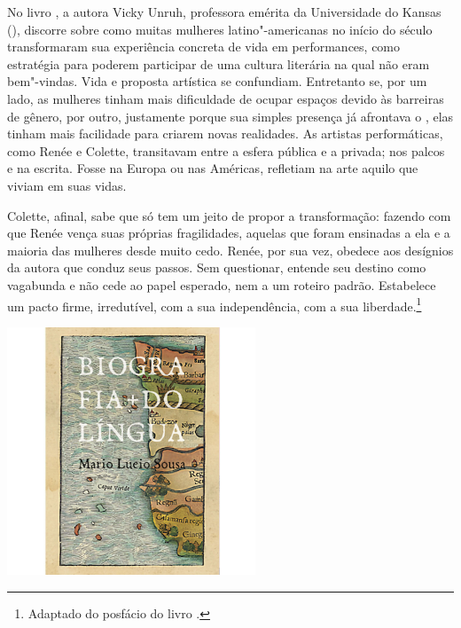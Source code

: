 No livro {}, a autora Vicky Unruh, professora emérita da Universidade do Kansas (), discorre sobre como muitas mulheres latino"-americanas no início do século  transformaram sua experiência concreta de vida em performances, como estratégia para poderem participar de uma cultura literária na qual não eram bem"-vindas. Vida e proposta artística se confundiam. Entretanto se, por um lado, as mulheres tinham mais dificuldade de ocupar espaços devido às barreiras de gênero, por outro, justamente porque sua simples presença já afrontava o {}, elas tinham mais facilidade para criarem novas realidades. As artistas performáticas, como Renée e Colette, transitavam entre a esfera pública e a privada; nos palcos e na escrita. Fosse na Europa ou nas Américas, refletiam na arte aquilo que viviam em suas vidas.

Colette, afinal, sabe que só tem um jeito de propor a transformação: fazendo com que Renée vença suas próprias fragilidades, aquelas que foram ensinadas a ela e a maioria das mulheres desde muito cedo. Renée, por sua vez, obedece aos desígnios da autora que conduz seus passos. Sem questionar, entende seu destino como vagabunda e não cede ao papel esperado, nem a um roteiro padrão. Estabelece um pacto firme, irredutível, com a sua independência, com a sua liberdade.\footnote{Adaptado do posfácio do livro {}.}


\pagebreak %


\begin{center}
\hspace*{.5cm}\includegraphics[width=74mm]{./grid/lingua.jpg}
\end{center}


